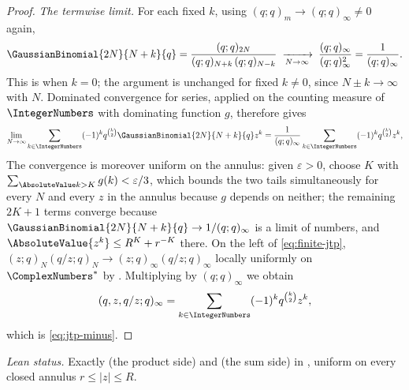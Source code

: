 \documentclass[11pt,a4paper,oneside,openany]{book}
\theoremstyle{definition}
\theoremstyle{remark}
\begin{document}
\begin{proof}
\emph{The termwise limit.}  For each fixed $k$, using $(q;q)_m\to(q;q)_\infty\ne0$ again,
\[
 \GaussianBinomial{2N}{N+k}{q}
 =\frac{(q;q)_{2N}}{(q;q)_{N+k}\,(q;q)_{N-k}}
 \;\xrightarrow[N\to\infty]{}\;
 \frac{(q;q)_\infty}{(q;q)_\infty^{2}}
 =\frac1{(q;q)_\infty}.
\]
This is  when $k=0$; the argument is unchanged for
fixed $k\ne0$, since $N\pm k\to\infty$ with $N$.
Dominated convergence for series, applied on the counting measure of $\IntegerNumbers$ with dominating function $g$, therefore gives
\[
 \lim_{N\to\infty}\sum_{k\in\IntegerNumbers}(-1)^kq^{\binom k2}
 \GaussianBinomial{2N}{N+k}{q}z^{k}
 =\frac1{(q;q)_\infty}\sum_{k\in\IntegerNumbers}(-1)^kq^{\binom k2}z^{k},
\]
The convergence is moreover uniform on the annulus: given $\varepsilon>0$, choose $K$ with $\sum_{\AbsoluteValue k>K}g(k)<\varepsilon/3$, which bounds the two tails simultaneously for every $N$ and every $z$ in the annulus because $g$ depends on neither; the remaining $2K+1$ terms converge because $\GaussianBinomial{2N}{N+k}{q}\to1/(q;q)_\infty$ is a limit of numbers, and $\AbsoluteValue{z^k}\le R^{K}+r^{-K}$ there.  On the left of \eqref{eq:finite-jtp}, $(z;q)_N(q/z;q)_N\to(z;q)_\infty(q/z;q)_\infty$ locally uniformly on $\ComplexNumbers^{*}$ by .  Multiplying by $(q;q)_\infty$ we obtain
\[
 (q,z,q/z;q)_\infty
 =\sum_{k\in\IntegerNumbers}(-1)^kq^{\binom k2}z^{k},
\]
which is \eqref{eq:jtp-minus}.
\end{proof}

\emph{Lean status.}  Exactly  (the
product side) and  (the sum side)
in , uniform on every closed annulus
$r\le|z|\le R$.
\end{document}
